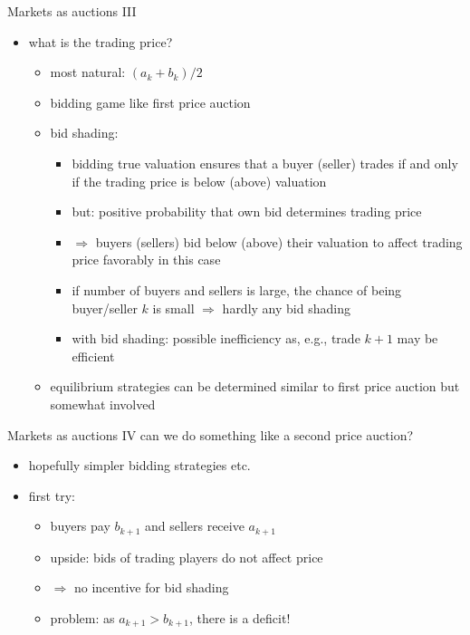 \documentclass[bigger]{beamer}
\newcommand{\Ra}{\Rightarrow} \newcommand{\ra}{\rightarrow} \newcommand{\Lra}{\Leftrightarrow}
\begin{document}
\begin{frame}[label={sec:org1f8ce68}]{Markets as auctions III}
\begin{itemize}
\item what is the trading price?
\begin{itemize}
\item most natural: \((a_k+b_k)/2\)
\item bidding game like first price auction
\item bid shading:
\begin{itemize}
\item bidding true valuation ensures that a buyer (seller) trades if and only if the trading price is below (above) valuation
\item but: positive probability that own bid determines trading price
\item \(\Ra\) buyers (sellers) bid below (above) their valuation to affect trading price favorably in this case
\item if number of buyers and sellers is large, the chance of being buyer/seller \(k\) is small \(\Ra\) hardly any bid shading
\item with bid shading: possible inefficiency as, e.g., trade \(k+1\) may be efficient
\end{itemize}
\item equilibrium strategies can be determined similar to first price auction but somewhat involved
\end{itemize}
\end{itemize}
\end{frame}

\begin{frame}[label={sec:orga967796}]{Markets as auctions IV}
can we do something like a second price auction?
\begin{itemize}
\item hopefully simpler bidding strategies etc.
\item first try:
\begin{itemize}
\item buyers pay \(b_{k+1}\) and sellers receive \(a_{k+1}\)
\item upside: bids of trading players do not affect price
\item \(\Ra\) no incentive for bid shading
\item problem: as \(a_{k+1}>b_{k+1}\), there is a deficit!
\end{itemize}
\end{itemize}
\end{frame}
\end{document}

